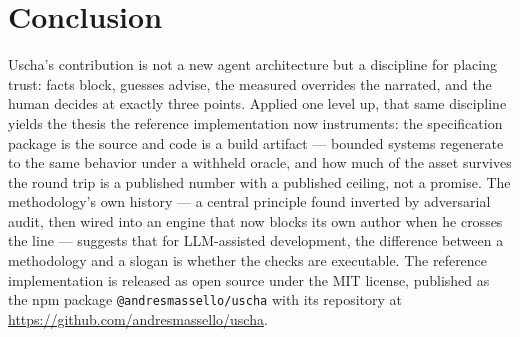 \documentclass[11pt]{article}
\begin{document}
\section{Conclusion}\label{sec:conclusion}

Uscha's contribution is not a new agent architecture but a discipline for
placing trust: facts block, guesses advise, the measured overrides the
narrated, and the human decides at exactly three points. Applied one level up,
that same discipline yields the thesis the reference implementation now
instruments: the specification package is the source and code is a build
artifact --- bounded systems regenerate to the same behavior under a withheld
oracle, and how much of the asset survives the round trip is a published number
with a published ceiling, not a promise. The methodology's own
history --- a central principle found inverted by adversarial audit, then
wired into an engine that now blocks its own author when he crosses the line
--- suggests that for LLM-assisted development, the difference between a
methodology and a slogan is whether the checks are executable. The reference
implementation is released as open source under the MIT license, published as
the npm package \texttt{@andresmassello/uscha} with its repository at
\url{https://github.com/andresmassello/uscha}.
\end{document}
